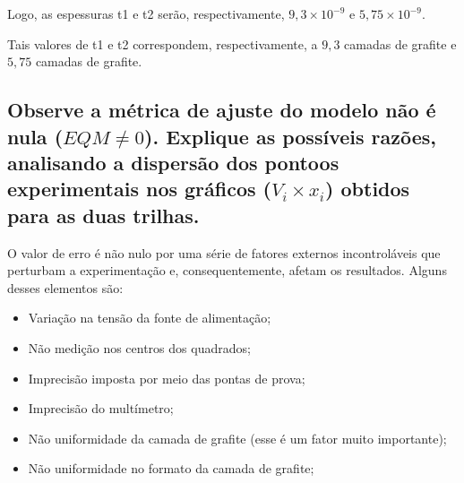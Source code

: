 \documentclass[12pt]{IEEEtran}
\begin{document}
Logo, as espessuras t1 e t2 serão, respectivamente, $9,3\times 10^{-9}$ e $5,75\times 10^{-9}$.

Tais valores de t1 e t2 correspondem, respectivamente, a $9,3$ camadas de grafite e $5,75$ camadas de grafite.


\subsection{Observe a métrica de ajuste do modelo não é nula ($EQM\neq 0$). Explique as possíveis razões, analisando a dispersão dos pontoos experimentais nos gráficos ($V_i \times x_i$) obtidos para as duas trilhas.}

O valor de erro é não nulo por uma série de fatores externos incontroláveis que perturbam a experimentação e, consequentemente, afetam os resultados. Alguns desses elementos são:

\begin{itemize}
  \item Variação na tensão da fonte de alimentação;
  \item Não medição nos centros dos quadrados;
  \item Imprecisão imposta por meio das pontas de prova;
  \item Imprecisão do multímetro;
  \item Não uniformidade da camada de grafite (esse é um fator muito importante);
  \item Não uniformidade no formato da camada de grafite;
\end{itemize}
\end{document}
